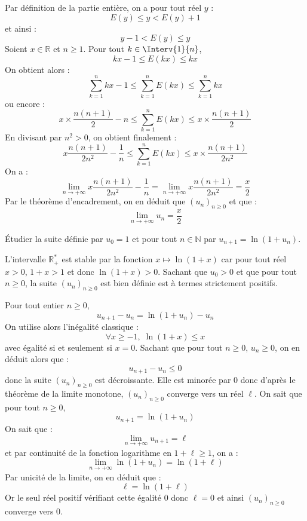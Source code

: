 \documentclass[a4paper,10pt]{report}
\begin{document}
\corr Par définition de la partie entière, on a pour tout réel $y$ :
$$ E(y) \leq y < E(y) + 1 $$
et ainsi :
$$ y-1 < E(y) \leq y$$
Soient $x \in \mathbb{R}$ et $n \geq 1$. Pour tout $k \in \Interv{1}{n}$,
$$ kx - 1 \leq E(kx) \leq kx $$
On obtient alors :
$$ \sum_{k=1}^n kx-1 \leq \sum_{k=1}^n E(kx) \leq \sum_{k=1}^n kx $$
ou encore :
$$ x \times \dfrac{n(n+1)}{2} - n \leq \sum_{k=1}^n E(kx) \leq x \times \dfrac{n(n+1)}{2}$$
En divisant par $n^2 >0$, on obtient finalement :
$$ x \dfrac{n(n+1)}{2n^2} - \dfrac{1}{n} \leq \sum_{k=1}^n E(kx) \leq x \times \dfrac{n(n+1)}{2n^2}$$
On a :
$$ \lim_{n \rightarrow + \infty} x \dfrac{n(n+1)}{2n^2} - \dfrac{1}{n}  = \lim_{n \rightarrow + \infty} x \dfrac{n(n+1)}{2n^2} = \dfrac{x}{2}$$
Par le théorème d'encadrement, on en déduit que $(u_n)_{n \geq 0}$ et que :
$$ \lim_{n \rightarrow + \infty} u_n = \dfrac{x}{2}$$

\medskip

\begin{Exercice}{} Étudier la suite définie par $u_0=1$ et pour tout $n \in \mathbb{N}$ par $u_{n+1}=\ln(1+u_n)$.
\end{Exercice} 

\corr L'intervalle $\mathbb{R}_+^{*}$ est stable par la fonction $x \mapsto \ln(1+x)$ car pour tout réel $x>0$, $1+x>1$ et donc $\ln(1+x)>0$. Sachant que $u_0>0$ et que pour tout $n \geq 0$, la suite $(u_n)_{n \geq 0}$ est bien définie est à termes strictement positifs.

\medskip

\noindent Pour tout entier $n \geq 0$,
$$u_{n+1}-u_n = \ln(1+u_n)-u_n $$
On utilise alors l'inégalité classique :
$$ \forall x \geq -1, \; \ln(1+x) \leq x$$
avec égalité si et seulement si $x=0$. Sachant que pour tout $n \geq 0$, $u_n \geq 0$, on en déduit alors que :
$$ u_{n+1}-u_n \leq 0$$
donc la suite $(u_n)_{n \geq 0}$ est décroissante. Elle est minorée par $0$ donc d'après le théorème de la limite monotone, $(u_n)_{n \geq 0}$ converge vers un réel $\ell$. On sait que pour tout $n \geq 0$,
$$ u_{n+1} = \ln(1+u_n)$$
On sait que :
$$ \lim_{n \rightarrow + \infty} u_{n+1} = \ell$$
et par continuité de la fonction logarithme en $1+ \ell \geq 1$, on a :
$$ \lim_{n \rightarrow + \infty} \ln(1+u_n) = \ln(1+ \ell)$$
Par unicité de la limite, on en déduit que :
$$ \ell = \ln(1+\ell)$$
Or le seul réel positif vérifiant cette égalité $0$ donc $\ell=0$ et ainsi $(u_n)_{n \geq 0}$ converge vers $0$.

%
\end{document}
